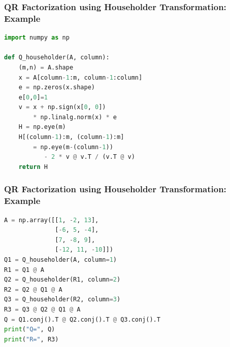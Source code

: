 \documentclass{beamer}
\begin{document}
\begin{frame}[fragile]\frametitle{QR Factorization using Householder Transformation: Example}
\begin{lstlisting}[language=Python]
import numpy as np

def Q_householder(A, column):
    (m,n) = A.shape
    x = A[column-1:m, column-1:column]
    e = np.zeros(x.shape)
    e[0,0]=1
    v = x + np.sign(x[0, 0]) 
        * np.linalg.norm(x) * e
    H = np.eye(m)
    H[(column-1):m, (column-1):m]
        = np.eye(m-(column-1))
           - 2 * v @ v.T / (v.T @ v)
    return H

\end{lstlisting}
\end{frame}

\begin{frame}[fragile]\frametitle{QR Factorization using Householder Transformation: Example}
\begin{lstlisting}[language=Python]
A = np.array([[1, -2, 13],
              [-6, 5, -4],
              [7, -8, 9],
              [-12, 11, -10]])
Q1 = Q_householder(A, column=1)
R1 = Q1 @ A
Q2 = Q_householder(R1, column=2)
R2 = Q2 @ Q1 @ A
Q3 = Q_householder(R2, column=3)
R3 = Q3 @ Q2 @ Q1 @ A
Q = Q1.conj().T @ Q2.conj().T @ Q3.conj().T
print("Q=", Q)
print("R=", R3)
\end{lstlisting}
\end{frame}
\end{document}
